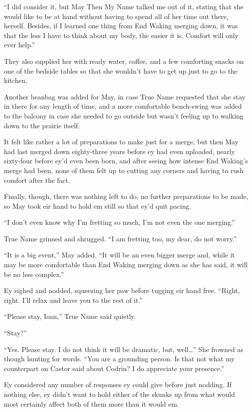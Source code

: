 ``I did consider it, but May Then My Name talked me out of it, stating that she would like to be at hand without having to spend all of her time out there, herself. Besides, if I learned one thing from End Waking merging down, it was that the less I have to think about my body, the easier it is. Comfort will only ever help.''

They also supplied her with ready water, coffee, and a few comforting snacks on one of the bedside tables so that she wouldn't have to get up just to go to the kitchen.

Another beanbag was added for May, in case True Name requested that she stay in there for any length of time, and a more comfortable bench-swing was added to the balcony in case she needed to go outside but wasn't feeling up to walking down to the prairie itself.

It felt like rather a lot of preparations to make just for a merge, but then May had last merged down eighty-three years before ey had even uploaded, nearly sixty-four before ey'd even been born, and after seeing how intense End Waking's merge had been, none of them felt up to cutting any corners and having to rush comfort after the fact.

Finally, though, there was nothing left to do, no further preparations to be made, so May took eir hand to hold em still so that ey'd quit pacing.

``I don't even know why I'm fretting so much, I'm not even the one merging.''

True Name grinned and shrugged. ``I am fretting too, my dear, do not worry.''

``It is a big event,'' May added. ``It will be an even bigger merge and, while it may be more comfortable than End Waking merging down as she has said, it will be no less complex.''

Ey sighed and nodded, squeezing her paw before tugging eir hand free. ``Right, right. I'll relax and leave you to the rest of it.''

``Please stay, Ioan,'' True Name said quietly.

``Stay?''

``Yes. Please stay. I do not think it will be dramatic, but, well\ldots{}'' She frowned as though hunting for words. ``You are a grounding person. Is that not what my counterpart on Castor said about Codrin? I do appreciate your presence.''

Ey considered any number of responses ey could give before just nodding. If nothing else, ey didn't want to hold either of the skunks up from what would most certainly affect both of them more than it would em.

